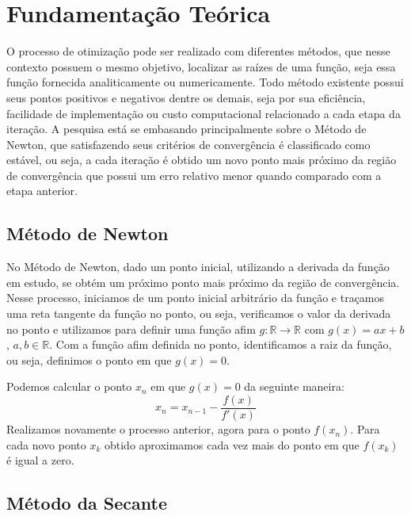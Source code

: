 \section{Fundamentação Teórica}
\label{sec:teorical-base}
  O processo de otimização pode ser realizado com diferentes métodos, que nesse contexto possuem o mesmo objetivo, localizar as raízes de uma função, seja essa função fornecida analiticamente ou numericamente. Todo método existente possui seus pontos positivos e negativos dentre os demais, seja por sua eficiência, facilidade de implementação ou custo computacional relacionado a cada etapa da iteração. A pesquisa está se embasando principalmente sobre o Método de Newton, que satisfazendo seus critérios de convergência \cite{calculo_numerico_aplicado} é classificado como estável, ou seja, a cada iteração é obtido um novo ponto mais próximo da região de convergência que possui um erro relativo menor quando comparado com a etapa anterior.

\subsection{Método de Newton}
\label{sec:newton-method}

No Método de Newton, dado um ponto inicial, utilizando a derivada da função em estudo, se obtém um próximo ponto mais próximo da região de convergência. Nesse processo, iniciamos de um ponto inicial arbitrário da função e traçamos uma reta tangente da função no ponto, ou seja, verificamos o valor da derivada no ponto e utilizamos para definir uma função afim $g: {\mathds{R}\to\mathds{R}}$ com $g(x) = ax + b$, $a, b \in \mathds{R}$. Com a função afim definida no ponto, identificamos a raiz da função, ou seja, definimos o ponto em que $g(x)=0$.

Podemos calcular o ponto $x_n$ em que $g(x) = 0$ da seguinte maneira:
%
\begin{equation}
  x_n = x_{n-1} - \frac{f(x)}{f'(x)}
\end{equation}
%
Realizamos novamente o processo anterior, agora para o ponto $f(x_n)$. Para cada novo ponto $x_k$ obtido aproximamos cada vez mais do ponto em que $f(x_k)$ é igual a zero.


\subsection{Método da Secante}

